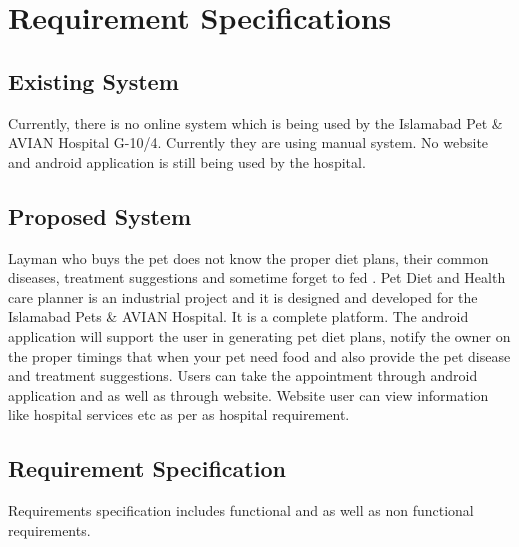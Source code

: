 \chapter{Requirement Specifications} \label{chap:reqs}


\section{Existing System}
Currently, there is no online system which is being used by the Islamabad Pet & AVIAN Hospital G-10/4. Currently they are using manual system. No website and android application is still being used by the hospital.
\section{Proposed System}
Layman who buys the pet does not know the proper diet plans, their common diseases, treatment suggestions and sometime forget to fed . Pet Diet and Health care planner is an industrial project and it is designed and developed for the Islamabad Pets & AVIAN Hospital. It is a complete platform. The android application will support the user in generating pet diet plans, notify the owner on the proper timings that when your pet need food and also provide the pet disease and treatment suggestions. Users can take the appointment through android application and as well as through website. Website user can view information like hospital services etc as per as hospital requirement.

\section{Requirement Specification}
Requirements specification includes functional and as well as non functional requirements.
